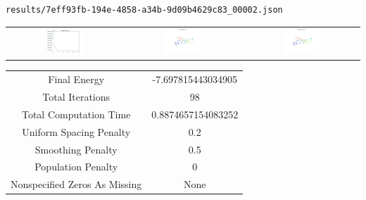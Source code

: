 \documentclass{report}
\begin{document}
\begin{lstlisting}
results/7eff93fb-194e-4858-a34b-9d09b4629c83_00002.json
\end{lstlisting}
\begin{tabular}{ccc}
\includegraphics[width=0.32\textwidth]{7eff93fb-194e-4858-a34b-9d09b4629c83_00002_energies.png}
&
\includegraphics[width=0.32\textwidth]{7eff93fb-194e-4858-a34b-9d09b4629c83_00002_initial_curves.png}
&
\includegraphics[width=0.32\textwidth]{7eff93fb-194e-4858-a34b-9d09b4629c83_00002_estimated_curves.png}
\\
\end{tabular}
\begin{tabular}{cc}
Final Energy&-7.697815443034905\\
Total Iterations&98\\
Total Computation Time&0.8874657154083252\\
Uniform Spacing Penalty&0.2\\
Smoothing Penalty&0.5\\
Population Penalty&0\\
Nonspecified Zeros As Missing&None\\
\end{tabular}
\end{document}
